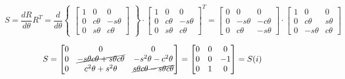 \documentclass[10pt,a4paper]{article}
\begin{document}
 $$
	S = \frac{dR}{d\theta} R^T = \frac{d}{d\theta}
	\begin{Bmatrix}
	\begin{bmatrix}
		1 & 0 & 0 \\
		0 & c\theta & -s\theta\\
		0 & s\theta & c\theta
	 \end{bmatrix}
	 \end{Bmatrix}
	\cdot
	 \begin{bmatrix}
	 	1 & 0 & 0 \\
		0 & c\theta & -s\theta\\
		0 & s\theta & c\theta
	 \end{bmatrix}^T =
	\begin{bmatrix}
	 	0 & 0 & 0 \\
		0 & -s\theta & -c\theta\\
		0 & c\theta & -s\theta
	 \end{bmatrix} \cdot
	 \begin{bmatrix}
	 	1 & 0 & 0 \\
		0 & c\theta & s\theta\\
		0 & -s\theta & c\theta
	 \end{bmatrix}
 $$

 $$
	S =
	\begin{bmatrix}
		0 & 0 & 0 \\
		0 & \cancel{-s\theta c\theta + s\theta c\theta} & -s^2\theta - c^2\theta \\
		0 & c^2\theta + s^2\theta & \cancel{s\theta c\theta - s\theta c\theta}
	\end{bmatrix} =
	\begin{bmatrix}
		0 & 0 & 0 \\
		0 & 0 & -1 \\
		0 & 1 & 0
	\end{bmatrix} = S(i)
 $$
\end{document}
